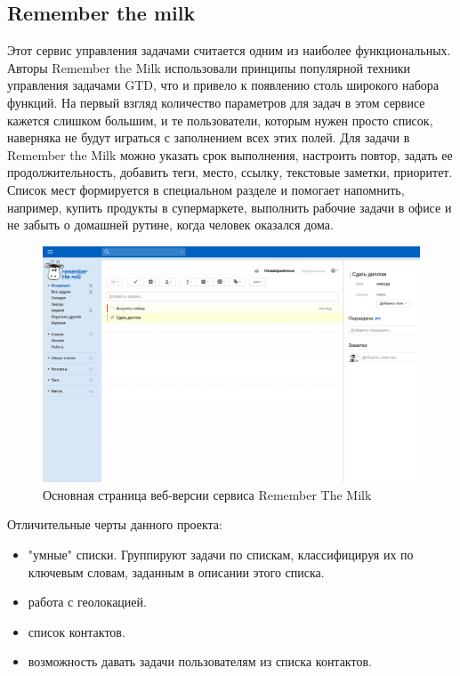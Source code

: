 \subsection{Remember the milk}
\label{sub:practice:analogs:remember_the_milk}

Этот сервис управления задачами считается одним из наиболее функциональных. Авторы Remember the Milk использовали принципы популярной техники управления задачами GTD, что и привело к появлению столь широкого набора функций. На первый взгляд количество параметров для задач в этом сервисе кажется слишком большим, и те пользователи, которым нужен просто список, наверняка не будут играться с заполнением всех этих полей. Для задачи в Remember the Milk можно указать срок выполнения, настроить повтор, задать ее продолжительность, добавить теги, место, ссылку, текстовые заметки, приоритет. Список мест формируется в специальном разделе и помогает напомнить, например, купить продукты в супермаркете, выполнить рабочие задачи в офисе и не забыть о домашней рутине, когда человек оказался дома. 

\begin{figure}[ht]
\centering
  \includegraphics[scale=0.35]{images/remember_the_milk.png}  
  \caption{  Основная страница веб-версии сервиса Remember The Milk }
  \label{fig:domain:remember_the_milk}
\end{figure}

Отличительные черты данного проекта:

\begin{itemize}
  \item "умные" списки. Группируют задачи по спискам, классифицируя их по ключевым словам, заданным в описании этого списка.
  \item работа с геолокацией. 
  \item список контактов.
  \item возможность давать задачи пользователям из списка контактов.
\end{itemize}

